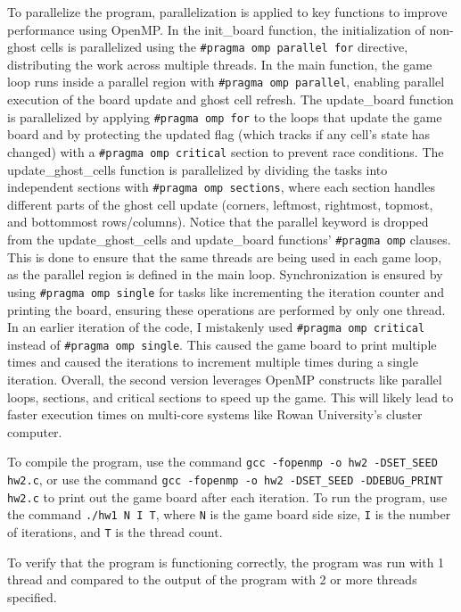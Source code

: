 \documentclass{article}
\begin{document}
	To parallelize the program, parallelization is applied to key functions to improve performance using OpenMP. In the init\_board function, the initialization of non-ghost cells is parallelized using the \texttt{\#pragma omp parallel for} directive, distributing the work across multiple threads. In the main function, the game loop runs inside a parallel region with \texttt{\#pragma omp parallel}, enabling parallel execution of the board update and ghost cell refresh. The update\_board function is parallelized by applying \texttt{\#pragma omp for} to the loops that update the game board and by protecting the updated flag (which tracks if any cell's state has changed) with a \texttt{\#pragma omp critical} section to prevent race conditions. The update\_ghost\_cells function is parallelized by dividing the tasks into independent sections with \texttt{\#pragma omp sections}, where each section handles different parts of the ghost cell update (corners, leftmost, rightmost, topmost, and bottommost rows/columns). Notice that the parallel keyword is dropped from the update\_ghost\_cells and update\_board functions’ \texttt{\#pragma omp} clauses. This is done to ensure that the same threads are being used in each game loop, as the parallel region is defined in the main loop. Synchronization is ensured by using \texttt{\#pragma omp single} for tasks like incrementing the iteration counter and printing the board, ensuring these operations are performed by only one thread. In an earlier iteration of the code, I mistakenly used \texttt{\#pragma omp critical} instead of \texttt{\#pragma omp single}. This caused the game board to print multiple times and caused the iterations to increment multiple times during a single iteration. Overall, the second version leverages OpenMP constructs like parallel loops, sections, and critical sections to speed up the game. This will likely lead to faster execution times on multi-core systems like Rowan University’s cluster computer.
	
	To compile the program, use the command \texttt{gcc -fopenmp -o hw2 -DSET\_SEED hw2.c}, or use the command \texttt{gcc -fopenmp -o hw2 -DSET\_SEED -DDEBUG\_PRINT hw2.c} to print out the game board after each iteration. To run the program, use the command \texttt{./hw1 N I T}, where \texttt{N} is the game board side size, \texttt{I} is the number of iterations, and \texttt{T} is the thread count.
	
	To verify that the program is functioning correctly, the program was run with 1 thread and compared to the output of the program with 2 or more threads specified.
\end{document}
